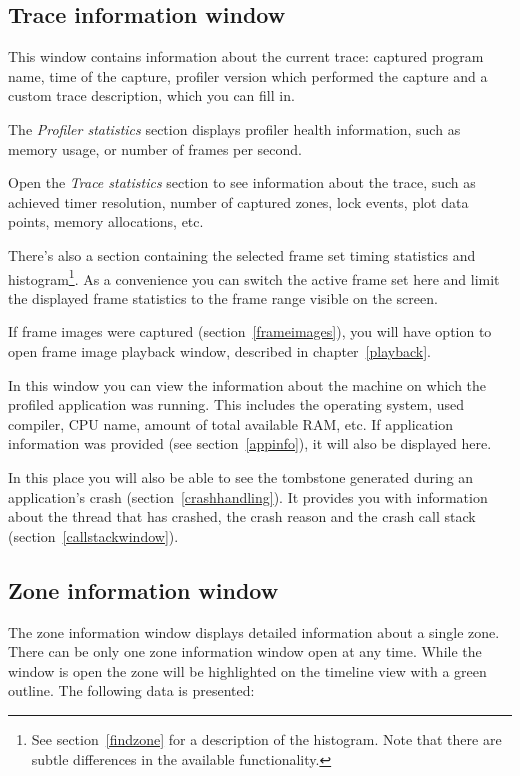 \documentclass[hidelinks,titlepage,a4paper]{article}
\begin{document}
\subsection{Trace information window}
\label{traceinfo}

This window contains information about the current trace: captured program name, time of the capture, profiler version which performed the capture and a custom trace description, which you can fill in.

The \emph{Profiler statistics} section displays profiler health information, such as memory usage, or number of frames per second.

Open the \emph{Trace statistics} section to see information about the trace, such as achieved timer resolution, number of captured zones, lock events, plot data points, memory allocations, etc.

There's also a section containing the selected frame set timing statistics and histogram\footnote{See section~\ref{findzone} for a description of the histogram. Note that there are subtle differences in the available functionality.}. As a convenience you can switch the active frame set here and limit the displayed frame statistics to the frame range visible on the screen.

If frame images were captured (section~\ref{frameimages}), you will have option to open frame image playback window, described in chapter~\ref{playback}.

In this window you can view the information about the machine on which the profiled application was running. This includes the operating system, used compiler, CPU name, amount of total available RAM, etc. If application information was provided (see section~\ref{appinfo}), it will also be displayed here.

In this place you will also be able to see the tombstone generated during an application's crash (section~\ref{crashhandling}). It provides you with information about the thread that has crashed, the crash reason and the crash call stack (section~\ref{callstackwindow}).

\subsection{Zone information window}
\label{zoneinfo}

The zone information window displays detailed information about a single zone. There can be only one zone information window open at any time. While the window is open the zone will be highlighted on the timeline view with a green outline. The following data is presented:
\end{document}
